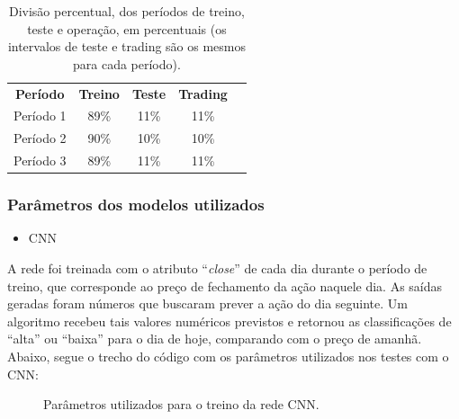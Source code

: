 \begin{table}[H]
\footnotesize
\centering
\caption{Divisão percentual, dos períodos de treino, teste e operação, em percentuais (os intervalos de teste e trading são os mesmos para cada período).}
\begin{tabular}{lllll}
\cline{1-4}
\multicolumn{1}{c}{\textbf{Período}} & \multicolumn{1}{c}{\textbf{Treino}} & \multicolumn{1}{c}{\textbf{Teste}} & \multicolumn{1}{c}{\textbf{Trading}} &  \\ \cline{1-4}
\multicolumn{1}{c}{Período   1} & \multicolumn{1}{c}{89\%} & \multicolumn{1}{c}{11\%} & \multicolumn{1}{c}{11\%} &  \\
\multicolumn{1}{c}{Período   2} & \multicolumn{1}{c}{90\%} & \multicolumn{1}{c}{10\%} & \multicolumn{1}{c}{10\%} &  \\
\multicolumn{1}{c}{Período   3} & \multicolumn{1}{c}{89\%} & \multicolumn{1}{c}{11\%} & \multicolumn{1}{c}{11\%} &  \\ \cline{1-4}
\end{tabular}
\end{table}


\subsubsection{Parâmetros dos modelos utilizados}

\begin{itemize}
\item{CNN}
\end{itemize}
 
\par
A rede foi treinada com o atributo “\textit{close}” de cada dia durante o período de treino, que corresponde ao preço de fechamento da ação naquele dia. As saídas geradas foram números que buscaram prever a ação do dia seguinte. Um algoritmo recebeu tais valores numéricos previstos e retornou as classificações de “alta” ou “baixa” para o dia de hoje, comparando com o preço de amanhã. Abaixo, segue o trecho do código com os parâmetros utilizados nos testes com o CNN:


\begin{figure}[hbt]
\caption{Parâmetros utilizados para o treino da rede CNN.}

\end{figure}

